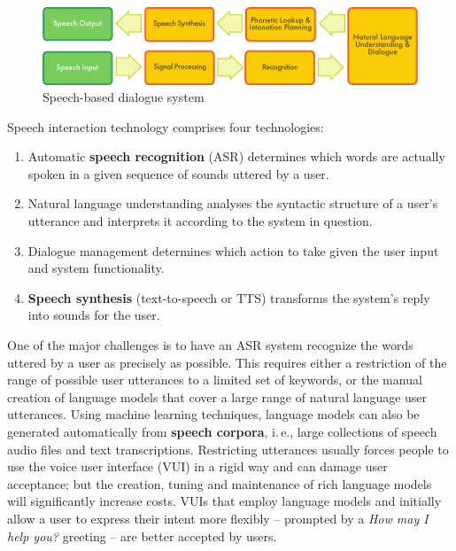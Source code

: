 \documentclass[]{../../metanetpaper}
\begin{document}
\begin{multicols}{2}

\begin{figure}[htb]
  \center
  \includegraphics[width=\textwidth]{../_media/english/simple_speech-based_dialogue_architecture}
  \caption{Speech-based dialogue system}
  \label{fig:dialoguearch_en}
\end{figure}

Speech interaction technology comprises four technologies: 

\begin{enumerate}
\item Automatic \textbf{speech recognition} (ASR) determines which words are actually spoken in a given sequence of sounds uttered by a user.  
\item Natural language understanding analyses the syntactic structure of a user’s utterance and interprets it according to the system in question.
\item Dialogue management determines which action to take given the user input and system functionality.   
\item \textbf{Speech synthesis} (text-to-speech or TTS) transforms the system’s reply into sounds for the user.
\end{enumerate}

One of the major challenges is to have an ASR system recognize the words uttered by a user as precisely as possible. This requires either a restriction of the range of possible user utterances to a limited set of keywords, or the manual creation of language models that cover a large range of natural language user utterances. Using machine learning techniques, language models can also be generated automatically from \textbf{speech corpora}, i.\,e., large collections of speech audio files and text transcriptions. Restricting utterances usually forces people to use the voice user interface (VUI) in a rigid way and can damage user acceptance; but the creation, tuning and maintenance of rich language models will significantly increase costs. VUIs that employ language models and initially allow a user to express their intent more flexibly -- prompted by a \textit{How may I help you?} greeting -- are better accepted by users.


\end{multicols}
\end{document}

